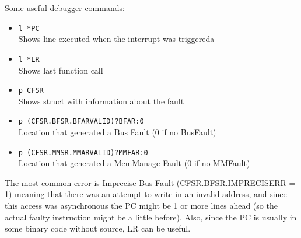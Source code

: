 Some useful debugger commands:

\begin{itemize}
\item  \verb/l *PC/ \\
  Shows line executed when the interrupt was triggereda

\item  \verb/l *LR/ \\
  Shows last function call

\item  \verb/p CFSR/ \\
  Shows struct with information about the fault
\item  \verb/p (CFSR.BFSR.BFARVALID)?BFAR:0/ \\
  Location that generated a Bus Fault (0 if no BusFault)
\item  \verb/p (CFSR.MMSR.MMARVALID)?MMFAR:0/ \\
  Location that generated a MemManage Fault (0 if no MMFault)
\end{itemize}

The most common error is Imprecise Bus Fault (CFSR.BFSR.IMPRECISERR = 1) meaning that there was an attempt to write in an invalid address, and since this access was asynchronous the PC might be 1 or more lines ahead (so the actual faulty instruction might be a little before). Also, since the PC is usually in some binary code without source, LR can be useful.


